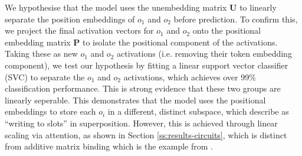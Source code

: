 We hypothesise that the model uses the unembedding matrix $\boldsymbol U$ to linearly separate the position embeddings of $o_1$ and $o_2$ before prediction. 
To confirm this, we project the final activation vectors for $o_1$ and $o_2$ onto the positional embedding matrix $\boldsymbol P$ to isolate the positional component of the activations. Taking these as new $o_1$ and $o_2$ activations (i.e. removing their token embedding component), we test our hypothesis by fitting a linear support vector classifier (SVC) \citep{cortes1995support} to separate the $o_1$ and $o_2$ activations, which achieves over 99\% classification performance. This is strong evidence that these two groups are linearly seperable.
This demonstrates that the model uses the positional embeddings to store each $o_i$ in a different, distinct subspace, which \citet{wattenberg2024relational} describe as “writing to slots” in superposition. However, this is achieved through linear scaling via attention, as shown in Section \ref{ss:results-circuits}, which is distinct from additive matrix binding which is the example from \citet{wattenberg2024relational}.
